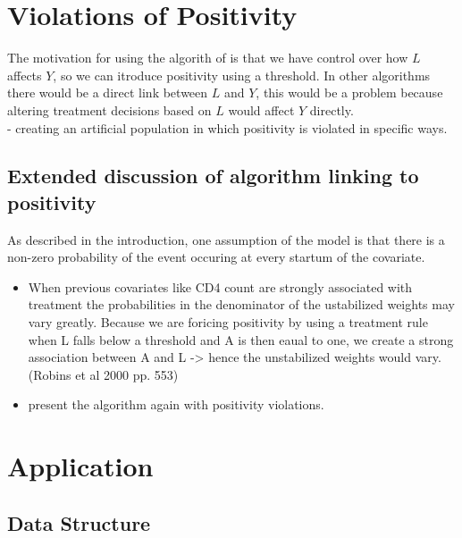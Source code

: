 \documentclass[11pt]{article}
\providecommand{\tightlist}{%
      \setlength{\itemsep}{0pt}\setlength{\parskip}{0pt}}
\begin{document}
    \section{Violations of Positivity}\label{violations-of-positivity}

The motivation for using the algorith of \citet{Havercroft2012} is that
we have control over how \(L\) affects \(Y\), so we can itroduce
positivity using a threshold. In other algorithms there would be a
direct link between \(L\) and \(Y\), this would be a problem because
altering treatment decisions based on \(L\) would affect \(Y\)
directly.\\
- creating an artificial population in which positivity is violated in
specific ways.

\subsection{Extended discussion of algorithm linking to
positivity}\label{extended-discussion-of-algorithm-linking-to-positivity}

As described in the introduction, one assumption of the model is that
there is a non-zero probability of the event occuring at every startum
of the covariate.

\begin{itemize}
\tightlist
\item
  When previous covariates like CD4 count are strongly associated with
  treatment the probabilities in the denominator of the ustabilized
  weights may vary greatly. Because we are foricing positivity by using
  a treatment rule when L falls below a threshold and A is then eaual to
  one, we create a strong association between A and L -\textgreater{}
  hence the unstabilized weights would vary. (Robins et al 2000 pp. 553)
\item
  present the algorithm again with positivity violations.
\end{itemize}

    \section{Application}\label{application}

\subsection{Data Structure}\label{data-structure}
\end{document}
